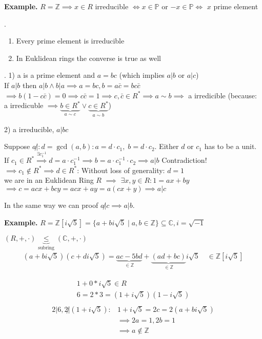 \textbf{Example.}
$R = \mathbb{Z} \implies x \in R$ irreducible $\iff x \in \mathbb{P}$ or $-x \in \mathbb{P} \iff $ $x$ prime element

\Theorem.
\begin{enumerate}
  \item Every prime element is irreducible
  \item In Euklidean rings the converse is true as well
\end{enumerate}

\Proof.
1) a is a prime element and $a = bc$ (which implies $a |b$ or $a|c$)\\
If $a|b$ then $a|b \land b|a \implies a = bc, b = a\bar{c} = b c\bar{c}$\\
$\implies b(1-c\bar{c}) = 0 \implies c\bar{c} = 1 \implies c, \bar{c} \in R^{*}
\implies a \sim b \implies$ a irredicible
(because: a irredicuble $\implies \underbrace{b \in R^{*}}_{a \sim c} \lor \underbrace{c \in R^{*}}_{a \sim b}$)

2) a irreducible, $a|bc$

Suppose $a \not|: d = \gcd(a,b): a = d\cdot c_1,\; b = d\cdot c_2$.
Either $d$ or $c_1$ has to be a unit.
If $c_1 \in R^{*} \stackrel{\exists c_1^{-1}}{\implies} d = a\cdot c_1^{-1} \implies b = a \cdot c_1^{-1} \cdot c_2 \implies a |b$ Contradiction! \\
$\implies c_1 \not\in R^{*} \implies d \in R^{*}$:
Without loss of generality: $d = 1$\\
we are in an Euklidean Ring $R$ $\implies$ $\exists x,y \in R: 1 = ax + by$ \\
$\implies c = acx + bcy = acx + ay = a (cx+y) \implies a|c$

In the same way we can proof $a\not|c \implies a|b$.

\textbf{Example.}
$R = \mathbb{Z} [i \sqrt{5}] = \{a+bi \sqrt{5} \mid a,b \in \mathbb{Z} \} \subseteq \mathbb{C}, i = \sqrt{-1}$

$(R,+,\cdot) \underbrace{\leq}_{\text{subring}} (\mathbb{C}, +,\cdot)$
\begin{align*}
  (a+bi \sqrt{5}) (c+di\sqrt{5}) =
    \underbrace{ac - 5bd}_{\in \mathbb{Z}} + \underbrace{(ad+bc)}_{\in \mathbb{Z}} i\sqrt{5} \quad \in \mathbb{Z}[i\sqrt{5}]
\end{align*}

\begin{align*}
  1+0 * i\sqrt{5} \in R\\
  6 = 2*3 = (1+i\sqrt{5})(1-i\sqrt{5})\\
\end{align*}
\begin{align*}
  2|6, 2 \not| (1+i\sqrt{5}): & 1+i\sqrt{5} = 2c = 2(a+bi\sqrt{5}) \\
    & \implies 2a = 1, 2b = 1 \\
    & \implies a \not\in \mathbb{Z}
\end{align*}

